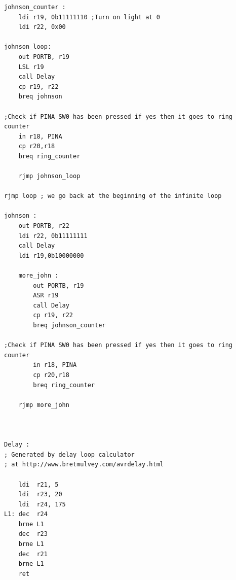 \documentclass[a4paper,12pt]{article}
\begin{document}
\begin{lstlisting}
johnson_counter :
	ldi r19, 0b11111110 ;Turn on light at 0
	ldi r22, 0x00

johnson_loop:
	out PORTB, r19
	LSL r19
	call Delay
	cp r19, r22
	breq johnson

;Check if PINA SW0 has been pressed if yes then it goes to ring counter
	in r18, PINA
	cp r20,r18
	breq ring_counter

	rjmp johnson_loop

rjmp loop ; we go back at the beginning of the infinite loop

johnson :
	out PORTB, r22
	ldi r22, 0b11111111
	call Delay
	ldi r19,0b10000000

	more_john :
		out PORTB, r19
		ASR r19
		call Delay
		cp r19, r22
		breq johnson_counter

;Check if PINA SW0 has been pressed if yes then it goes to ring counter
		in r18, PINA
		cp r20,r18
		breq ring_counter

	rjmp more_john



Delay :
; Generated by delay loop calculator
; at http://www.bretmulvey.com/avrdelay.html

	ldi  r21, 5
    ldi  r23, 20
    ldi  r24, 175
L1: dec  r24
    brne L1
    dec  r23
    brne L1
    dec  r21
    brne L1
	ret



	
\end{lstlisting}
\break
\end{document}
